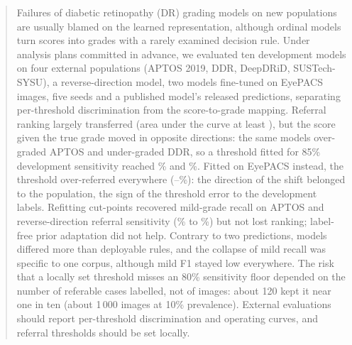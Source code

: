 \begin{abstract}
Failures of diabetic retinopathy (DR) grading models on new populations are usually blamed on the
learned representation, although ordinal models turn scores into grades with a rarely examined
decision rule. Under analysis plans committed in advance, we evaluated ten development models on four external populations (APTOS 2019, DDR,
DeepDRiD, SUSTech-SYSU), a reverse-direction model, two models fine-tuned
on  EyePACS images, five seeds and a published model's released predictions,
separating per-threshold discrimination from the score-to-grade mapping.
Referral ranking largely transferred (area under the curve at least ), but the
score given the true grade moved in opposite directions: the same models over-graded APTOS and
under-graded DDR, so a threshold fitted for 85\% development sensitivity reached
\% and \%. Fitted on EyePACS instead, the threshold
over-referred everywhere (--\%): the direction of the shift
belonged to the population, the sign of the threshold error to the development labels. Refitting
cut-points recovered mild-grade recall on APTOS and reverse-direction referral sensitivity
(\% to \%) but not lost ranking; label-free prior adaptation
did not help. Contrary to two predictions, models differed more than deployable rules, and the
collapse of mild recall was specific to one corpus, although mild F1 stayed low everywhere. The
risk that a locally set threshold misses an 80\% sensitivity floor depended on the number of
referable cases labelled, not of images: about 120 kept it near one in ten (about 1\,000 images at
10\% prevalence). External evaluations should report per-threshold discrimination and operating
curves, and referral thresholds should be set locally.
\end{abstract}
